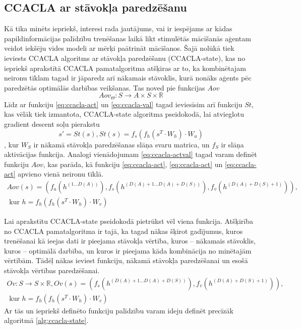 \documentclass{ludis} %
\begin{document}
\subsection{CCACLA ar stāvokļa paredzēšanu}
Kā tika minēts iepriekš, interesi rada jautājums, vai ir iespējams ar kādas
papildinformācijas palīdzību trenēšanas laikā likt stimulētās mācīšanās aģentam
veidot iekšēju vides modeli ar mērķi paātrināt mācīšanos. Šajā nolūkā tiek
ieviests CCACLA algoritms ar stāvokļa paredzēšanu (CCACLA-state), kas no iepriekš aprakstītā
CCACLA pamatalgoritma atšķiras ar to, ka kombinētajam neironu tīklam tagad ir
jāparedz arī nākamais stāvoklis, kurā nonāks aģents pēc paredzētās optimālās
darbības veikšanas. Tas noved pie funkcijas $Aov$ 
\begin{equation}
  Aov_\Theta:S \rightarrow A \times S \times \mathbb{R}
\end{equation}
Līdz ar funkciju \ref{eq:ccacla-act} un \ref{eq:ccacla-val} tagad ieviesīsim arī
funkciju $St$, kas vēlāk tiek izmantota, CCACLA-state algoritma pseidokodā, lai
atvieglotu gradient descent soļu pierakstu
\begin{equation}\label{eq:ccacla-obs}
  s' = St(s), St(s) = f_s(f_h(s^T \cdot W_h) \cdot W_a)
\end{equation} 
, kur $W_S$ ir nākamā stāvokļa paredzēšanas slāņa svaru matrica, un $f_S$ ir
slāņa aktivācijas funkcija.
Analogi vienādojumam \ref{eq:ccacla-actval} tagad varam definēt funkciju $Aov$,
kas parāda, kā funkciju \ref{eq:ccacla-act}, \ref{eq:ccacla-act} un
\ref{eq:ccacla-act} apvieno vienā neironu tīklā.
\begin{multline}\label{eq:ccacla-actobsval}
  Aov(s) = \left(f_a(h^{(1 \ldots D(A))}),
                 f_s(h^{(D(A) + 1 \ldots D(A) + D(S))}),
                 f_v(h^{(D(A) + D(S) + 1)})\right), \\
  \text{ kur } h = f_h\left(f_h(s^T \cdot W_h) \cdot W_v\right)
\end{multline}

Lai aprakstītu CCACLA-state pseidokodā pietrūkst vēl viena funkcija. Atšķirība no
CCACLA pamatalgoritma ir tajā, ka tagad nākas šķirot gadījumus, kuros
trenēšanai kā ieejas dati ir pieejama stāvokļa vērtība, kuros -- nākamais
stāvoklis, kuros -- optimālā darbība, un kuros ir pieejama kāda kombinācija no
minētajām vērtībām. Tādēļ nākas ieviest funkciju, nākamā stāvokļa paredzēšanai
un esošā stāvokļa vērtības paredzēšanai.
\begin{multline}\label{eq:ccacla-obsval}
  Ov: S \rightarrow S \times \mathbb{R},
        Ov(s) = \left(f_s(h^{(D(A) + 1 \ldots D(A) + D(S))}),
                 f_v(h^{(D(A) + D(S) + 1)})\right), \\
  \text{ kur } h = f_h\left(f_h(s^T \cdot W_h) \cdot W_v\right)
\end{multline}
Ar tās un iepriekš definēto funkciju palīdzību varam ideju definēt precīzāk
algoritmā \ref{alg:ccacla-state}.
\end{document}
